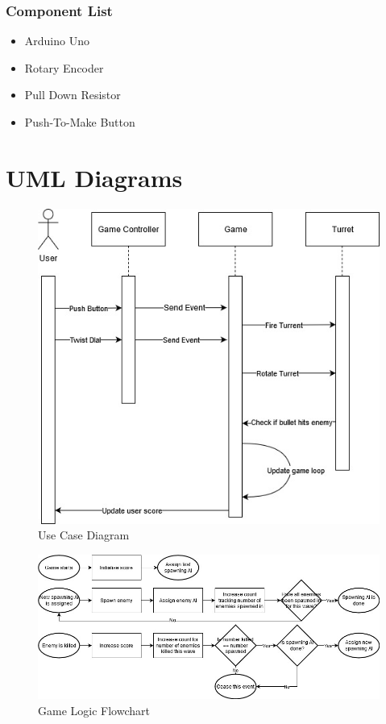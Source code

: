 \documentclass{article}
\begin{document}
            \subsubsection{Component List}
                \begin{itemize}
                    \item Arduino Uno
                    \item Rotary Encoder
                    \item Pull Down Resistor
                    \item Push-To-Make Button
                \end{itemize}
            

    \newpage

    \section{UML Diagrams}
    \begin{figure}[h!]
        \includegraphics[width = \linewidth]{Documentation Assets/UML Diagrm.jpg}
        \caption{Use Case Diagram}
    \end{figure}

    \begin{figure}[h!]
        \includegraphics[width = \linewidth]{Documentation Assets/PhysicalControllerFlowChart2.jpg}
        \caption{Game Logic Flowchart}
    \end{figure}
\end{document}
